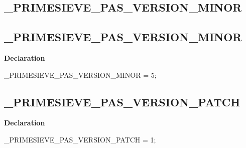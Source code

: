 \documentclass{report}
\newif\ifpdf
\begin{document}
\subsection*{\large{\textbf{{\_}PRIMESIEVE{\_}PAS{\_}VERSION{\_}MINOR}}\normalsize\hspace{1ex}\hrulefill}
\else
\subsection*{{\_}PRIMESIEVE{\_}PAS{\_}VERSION{\_}MINOR}
\fi
\label{primesieve-_PRIMESIEVE_PAS_VERSION_MINOR}
\begin{list}{}{
\setlength{\itemindent}{0cm}
\setlength{\listparindent}{0cm}
\setlength{\leftmargin}{\evensidemargin}
\addtolength{\leftmargin}{\tmplength}
\settowidth{\labelsep}{X}
\addtolength{\leftmargin}{\labelsep}
\setlength{\labelwidth}{\tmplength}
}
\item[\textbf{Declaration}\hfill]
\ifpdf
\begin{flushleft}
\fi
\begin{ttfamily}
{\_}PRIMESIEVE{\_}PAS{\_}VERSION{\_}MINOR = 5;\end{ttfamily}

\ifpdf
\end{flushleft}
\fi

\end{list}
\ifpdf
\subsection*{\large{\textbf{{\_}PRIMESIEVE{\_}PAS{\_}VERSION{\_}PATCH}}\normalsize\hspace{1ex}\hrulefill}
\else
\subsection*{{\_}PRIMESIEVE{\_}PAS{\_}VERSION{\_}PATCH}
\fi
\label{primesieve-_PRIMESIEVE_PAS_VERSION_PATCH}
\begin{list}{}{
\setlength{\itemindent}{0cm}
\setlength{\listparindent}{0cm}
\setlength{\leftmargin}{\evensidemargin}
\addtolength{\leftmargin}{\tmplength}
\settowidth{\labelsep}{X}
\addtolength{\leftmargin}{\labelsep}
\setlength{\labelwidth}{\tmplength}
}
\item[\textbf{Declaration}\hfill]
\ifpdf
\begin{flushleft}
\fi
\begin{ttfamily}
{\_}PRIMESIEVE{\_}PAS{\_}VERSION{\_}PATCH = 1;\end{ttfamily}

\ifpdf
\end{flushleft}
\fi

\end{list}
\ifpdf
\end{document}

